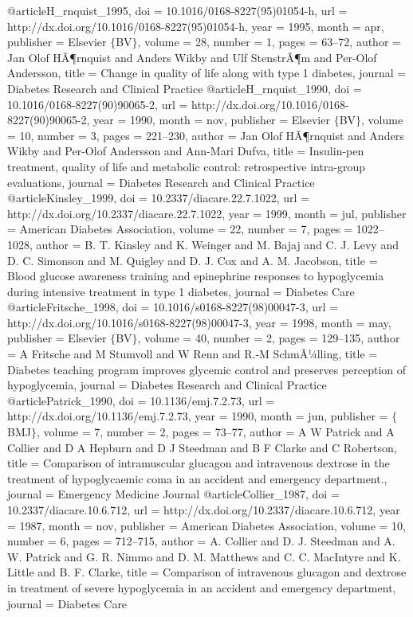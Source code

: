 @article{H_rnquist_1995,
	doi = {10.1016/0168-8227(95)01054-h},
	url = {http://dx.doi.org/10.1016/0168-8227(95)01054-h},
	year = 1995,
	month = {apr},
	publisher = {Elsevier $\lbrace$BV$\rbrace$},
	volume = {28},
	number = {1},
	pages = {63--72},
	author = {Jan Olof HÃ¶rnquist and Anders Wikby and Ulf StenstrÃ¶m and Per-Olof Andersson},
	title = {Change in quality of life along with type 1 diabetes},
	journal = {Diabetes Research and Clinical Practice}
}
@article{H_rnquist_1990,
	doi = {10.1016/0168-8227(90)90065-2},
	url = {http://dx.doi.org/10.1016/0168-8227(90)90065-2},
	year = 1990,
	month = {nov},
	publisher = {Elsevier $\lbrace$BV$\rbrace$},
	volume = {10},
	number = {3},
	pages = {221--230},
	author = {Jan Olof HÃ¶rnquist and Anders Wikby and Per-Olof Andersson and Ann-Mari Dufva},
	title = {Insulin-pen treatment, quality of life and metabolic control: retrospective intra-group evaluations},
	journal = {Diabetes Research and Clinical Practice}
}
@article{Kinsley_1999,
	doi = {10.2337/diacare.22.7.1022},
	url = {http://dx.doi.org/10.2337/diacare.22.7.1022},
	year = 1999,
	month = {jul},
	publisher = {American Diabetes Association},
	volume = {22},
	number = {7},
	pages = {1022--1028},
	author = {B. T. Kinsley and K. Weinger and M. Bajaj and C. J. Levy and D. C. Simonson and M. Quigley and D. J. Cox and A. M. Jacobson},
	title = {Blood glucose awareness training and epinephrine responses to hypoglycemia during intensive treatment in type 1 diabetes},
	journal = {Diabetes Care}
}
@article{Fritsche_1998,
	doi = {10.1016/s0168-8227(98)00047-3},
	url = {http://dx.doi.org/10.1016/s0168-8227(98)00047-3},
	year = 1998,
	month = {may},
	publisher = {Elsevier $\lbrace$BV$\rbrace$},
	volume = {40},
	number = {2},
	pages = {129--135},
	author = {A Fritsche and M Stumvoll and W Renn and R.-M SchmÃ¼lling},
	title = {Diabetes teaching program improves glycemic control and preserves perception of hypoglycemia},
	journal = {Diabetes Research and Clinical Practice}
}
@article{Patrick_1990,
	doi = {10.1136/emj.7.2.73},
	url = {http://dx.doi.org/10.1136/emj.7.2.73},
	year = 1990,
	month = {jun},
	publisher = {$\lbrace$BMJ$\rbrace$},
	volume = {7},
	number = {2},
	pages = {73--77},
	author = {A W Patrick and A Collier and D A Hepburn and D J Steedman and B F Clarke and C Robertson},
	title = {Comparison of intramuscular glucagon and intravenous dextrose in the treatment of hypoglycaemic coma in an accident and emergency department.},
	journal = {Emergency Medicine Journal}
}
@article{Collier_1987,
	doi = {10.2337/diacare.10.6.712},
	url = {http://dx.doi.org/10.2337/diacare.10.6.712},
	year = 1987,
	month = {nov},
	publisher = {American Diabetes Association},
	volume = {10},
	number = {6},
	pages = {712--715},
	author = {A. Collier and D. J. Steedman and A. W. Patrick and G. R. Nimmo and D. M. Matthews and C. C. MacIntyre and K. Little and B. F. Clarke},
	title = {Comparison of intravenous glucagon and dextrose in treatment of severe hypoglycemia in an accident and emergency department},
	journal = {Diabetes Care}
}
